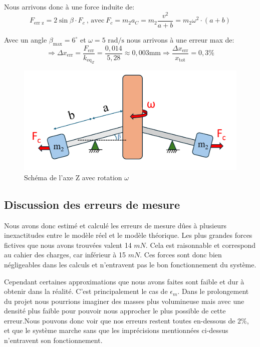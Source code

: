 \documentclass[a4paper, 11pt]{article} %
\begin{document}
Nous arrivons donc à une force induite de:
$$F_\text{err z}=2\sin{\beta}\cdot F_c \  \text{, avec} \ F_c = m_2a_C  = m_2\frac{v^2}{a+b} = m_2\omega^2\cdot (a+b)$$

Avec un angle $\beta_\text{max} = 6^\circ$ et $\omega = 5 \text{ rad/s}$ nous arrivons à une erreur max de:
$$\Rightarrow \Delta x_\text{err} = \frac{{F_\text{err}}}{k_{\text{eq}_Z}} = \frac{0,014}{5,28} \approx 0,003\mathrm{mm} \Rightarrow \frac{\Delta x_\text{err}}{x_\text{tot}} = 0,3\% $$

\begin{figure}[H]
    \centering
    \includegraphics[width=0.6\linewidth]{images/erreur_rotation_z.png}
    \caption{Schéma de l'axe Z avec rotation $\omega$}
    \label{fig:erreur_z_rotation}
\end{figure}

\subsection{Discussion des erreurs de mesure}
Nous avons donc estimé et calculé les erreurs de mesure dûes à plusieurs inexactitudes entre le modèle réel et le modèle théorique. Les plus grandes forces fictives que nous avons trouvées valent 14 $mN$. Cela est raisonnable et correspond au cahier des charges, car inférieur à 15 $mN$. Ces forces sont donc bien négligeables dans les calculs et  n'entravent pas le bon fonctionnement du système.

Cependant certaines approximations que nous avons faites sont faible et dur à obtenir dans la réalité. C'est principalement le cas de $\epsilon_m$. Dans le prolongement du projet nous pourrions imaginer des masses plus volumineuse mais avec une densité plus faible pour pouvoir nous approcher le plus possible de cette erreur.Nous pouvons donc voir que nos erreurs restent toutes en-dessous de 2\%, et que le système marche sans que les imprécisions mentionnées ci-dessus n'entravent son fonctionnement. 
\end{document}
